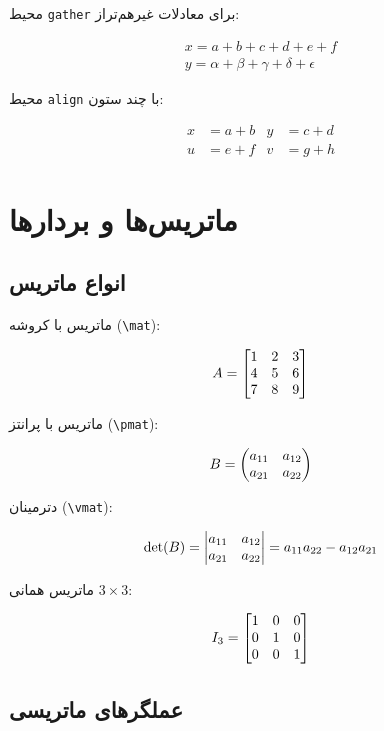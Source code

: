 \documentclass{matinbook}
\begin{document}
    محیط \texttt{gather} برای معادلات غیرهم‌تراز:
    
    \begin{gather}
        x = a + b + c + d + e + f \label{eq:long1} \\
        y = \alpha + \beta + \gamma + \delta + \epsilon \label{eq:long2}
    \end{gather}
    
    محیط \texttt{align} با چند ستون:
    
    \begin{align}
        x &= a + b & y &= c + d \label{eq:multi1} \\
        u &= e + f & v &= g + h \label{eq:multi2}
    \end{align}
    
    \chapter{ماتریس‌ها و بردارها}
    
    \section{انواع ماتریس}
    
    ماتریس با کروشه (\texttt{\textbackslash mat}):
    
    \[
    A = \begin{bmatrix}1 & 2 & 3 \\ 4 & 5 & 6 \\ 7 & 8 & 9\end{bmatrix}
    \]
    
    ماتریس با پرانتز (\texttt{\textbackslash pmat}):
    
    \[
    B = \begin{pmatrix}a_{11} & a_{12} \\ a_{21} & a_{22}\end{pmatrix}
    \]
    
    دترمینان (\texttt{\textbackslash vmat}):
    
    \[
    \det(B) = \begin{vmatrix}a_{11} & a_{12} \\ a_{21} & a_{22}\end{vmatrix}
    = a_{11}a_{22} - a_{12}a_{21}
    \]
    
    ماتریس همانی $3 \times 3$:
    
    \[
    I_{3} = \begin{bmatrix}1 & 0 & 0 \\ 0 & 1 & 0 \\ 0 & 0 & 1\end{bmatrix}
    \]
    
    \section{عملگرهای ماتریسی}
    
\end{document}
